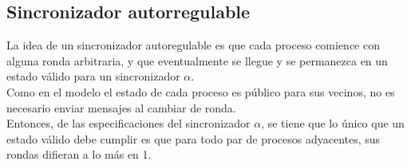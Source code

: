 \documentclass[12pt,a4paper]{article}
\begin{document}
{    \subsection{Sincronizador autorregulable}{
        La idea de un sincronizador autoregulable es que cada proceso comience
        con alguna ronda arbitraria, y que eventualmente se llegue y se
        permanezca en un estado válido para un sincronizador $\alpha$.\\
        Como en el modelo el estado de cada proceso es público para sus vecinos,
        no es necesario enviar mensajes al cambiar de ronda.\\
        Entonces, de las especificaciones del sincronizador $\alpha$, se tiene
        que lo único que un estado válido debe cumplir es que para todo par de
        procesos adyacentes, sus rondas difieran a lo más en 1.
    }

}
\end{document}
